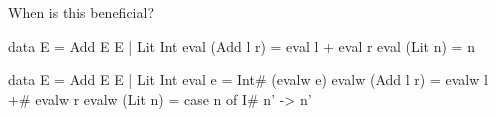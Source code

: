 \documentclass{haskellbeamer}
\begin{document}
\begin{frame}[fragile]{When is this beneficial?}
  \begin{center}
    \begin{overprint}
      \begin{haskell}
        data E = Add E E | Lit Int
        eval (Add l r) = eval l + eval r
        eval (Lit n) = n
      \end{haskell}
      \begin{haskell}
        data E = Add E E | Lit Int
        eval e = Int# (evalw e)
        evalw (Add l r) = evalw l +# evalw r
        evalw (Lit n) = case n of I# n' -> n'
      \end{haskell}
    \end{overprint}
  \end{center}
\end{frame}
\end{document}
